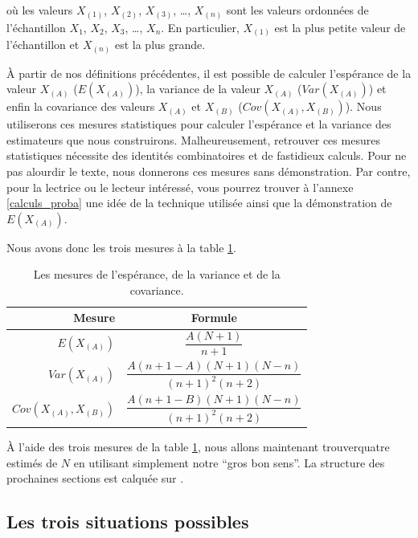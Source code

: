 \documentclass[10pt]{article}
\begin{document}
où les valeurs \(X_{(1)}\), \(X_{(2)}\), \(X_{(3)}\), \ldots{},
\(X_{(n)}\) sont les valeurs ordonnées de l'échantillon \(X_1\),
\(X_2\), \(X_3\), \ldots{}, \(X_n\). En particulier, \(X_{(1)}\) est la
plus petite valeur de l'échantillon et \(X_{(n)}\) est la plus grande.

À partir de nos définitions précédentes, il est possible de calculer
l'espérance de la valeur \(X_{(A)}\) (\(E(X_{(A)})\)), la variance de la
valeur \(X_{(A)}\) (\(Var(X_{(A)})\)) et enfin la covariance des valeurs
\(X_{(A)}\) et \(X_{(B)}\) (\(Cov(X_{(A)},X_{(B)})\)). Nous utiliserons
ces mesures statistiques pour calculer l'espérance et la variance des
estimateurs que nous construirons. Malheureusement, retrouver ces
mesures statistiques nécessite des identités combinatoires et de
fastidieux calculs. Pour ne pas alourdir le texte, nous donnerons ces
mesures sans démonstration. Par contre, pour la lectrice ou le lecteur
intéressé, vous pourrez trouver à l'annexe \ref{calculs_proba} une idée
de la technique utilisée ainsi que la démonstration de \(E(X_{(A)})\).

Nous avons donc les trois mesures à la table \ref{tab:mesures_stat}.

\begin{table}[ht]
\begin{center}
\begin{tabular}{|r|c|}
\hline
Mesure & Formule \\
\hline
\hline
$E(X_{(A)})$ & $\dfrac{A(N+1)}{n+1}$ \\ \hline
$Var(X_{(A)})$ & $\dfrac{A(n+1-A)(N+1)(N-n)}{(n+1)^2(n+2)}$ \\ \hline
$Cov(X_{(A)},X_{(B)})$ & $\dfrac{A(n+1-B)(N+1)(N-n)}{(n+1)^2(n+2)}$ \\ \hline
\end{tabular}
\end{center}
\caption{\label{tab:mesures_stat} {Les mesures de l'espérance, de la variance et de la covariance.} }
\end{table}

À l'aide des trois mesures de la table \ref{tab:mesures_stat}, nous
allons maintenant trouverquatre estimés de \(N\) en utilisant simplement
notre ``gros bon sens''. La structure des prochaines sections est
calquée sur \cite{Johnson}.

\hypertarget{les-trois-situations-possibles}{%
\subsection{Les trois situations
possibles}\label{les-trois-situations-possibles}}
\end{document}
